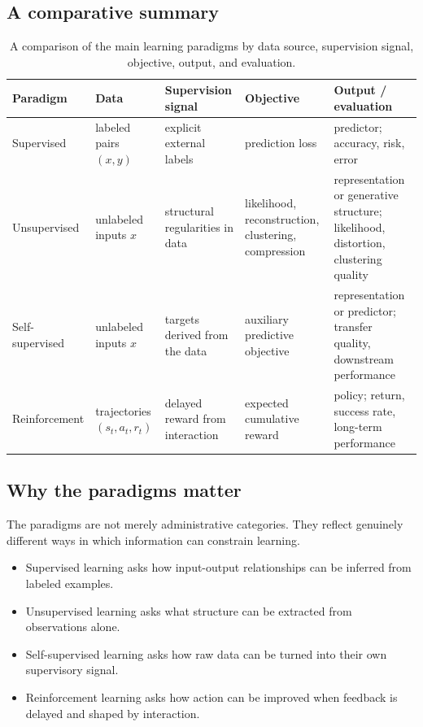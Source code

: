 \subsection*{A comparative summary}

\begin{table}[tbp]
\centering
\renewcommand{\arraystretch}{1.25}
\begin{tabular}{p{2.2cm}p{2.3cm}p{2.6cm}p{2.8cm}p{2.6cm}}
\toprule
\textbf{Paradigm} & \textbf{Data} & \textbf{Supervision signal} & \textbf{Objective} & \textbf{Output / evaluation} \\
\midrule
Supervised
& labeled pairs $(x,y)$
& explicit external labels
& prediction loss
& predictor; accuracy, risk, error \\
\addlinespace
Unsupervised
& unlabeled inputs $x$
& structural regularities in data
& likelihood, reconstruction, clustering, compression
& representation or generative structure; likelihood, distortion, clustering quality \\
\addlinespace
Self-supervised
& unlabeled inputs $x$
& targets derived from the data
& auxiliary predictive objective
& representation or predictor; transfer quality, downstream performance \\
\addlinespace
Reinforcement
& trajectories $(s_t,a_t,r_t)$
& delayed reward from interaction
& expected cumulative reward
& policy; return, success rate, long-term performance \\
\bottomrule
\end{tabular}
\caption{A comparison of the main learning paradigms by data source, supervision signal, objective, output, and evaluation.}
\end{table}

\subsection*{Why the paradigms matter}

The paradigms are not merely administrative categories. They reflect genuinely different ways in which information can constrain learning.

\begin{itemize}
    \item Supervised learning asks how input-output relationships can be inferred from labeled examples.
    \item Unsupervised learning asks what structure can be extracted from observations alone.
    \item Self-supervised learning asks how raw data can be turned into their own supervisory signal.
    \item Reinforcement learning asks how action can be improved when feedback is delayed and shaped by interaction.
\end{itemize}

